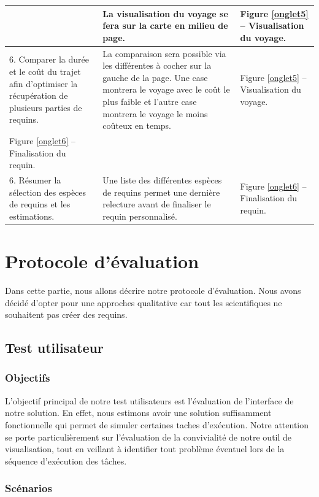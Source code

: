 \documentclass{article}
\begin{document}
\begin{center}
\begin{tabular}{|p{3.5cm}|p{7cm}|p{3.5cm}|}
		 &
		La visualisation du voyage se fera sur la carte en milieu de page.
		 &
		Figure \ref{onglet5} – Visualisation du voyage.
		\\\hline
		6. Comparer la durée et le coût du trajet afin d’optimiser la récupération de plusieurs parties de requins.
		 &
		La comparaison sera possible via les différentes à cocher sur la gauche de la page. Une case montrera le voyage avec le coût le plus faible et l’autre case montrera le voyage le moins coûteux en temps.
		 &
		Figure \ref{onglet5} – Visualisation du voyage.
		\\\hline
				Figure \ref{onglet6} – Finalisation du requin.
		\\\hline
		6. Résumer la sélection des espèces de requins et les estimations.
		 &
		Une liste des différentes espèces de requins permet une dernière relecture avant de finaliser le requin personnalisé.
		 &
		Figure \ref{onglet6} – Finalisation du requin.
		\\\hline
	\end{tabular}
\end{center}

\section{Protocole d'évaluation}
Dans cette partie, nous allons décrire notre protocole d’évaluation. Nous avons décidé d'opter pour une approches qualitative car tout les scientifiques ne souhaitent pas créer des requins.

\subsection{Test utilisateur}

\subsubsection{Objectifs}
L'objectif principal de notre test utilisateurs est l'évaluation de l'interface de notre solution. En effet, nous estimons avoir une solution suffisamment fonctionnelle qui permet de simuler certaines taches d'exécution.
Notre attention se porte particulièrement sur l'évaluation de la convivialité de notre outil de visualisation, tout en veillant à identifier tout problème éventuel lors de la séquence d'exécution des tâches.

\subsubsection{Scénarios}
\end{document}
